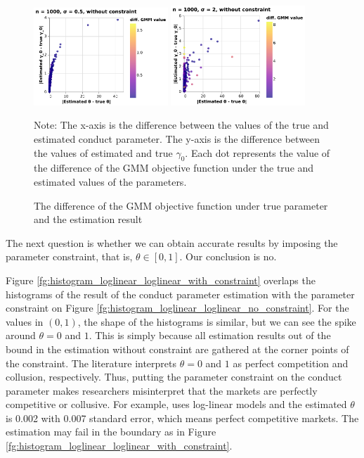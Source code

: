 \documentclass[11pt, a4paper]{article}
\begin{document}
\begin{figure}[!htbp]
  \begin{center}
  \includegraphics[width = 0.45\textwidth]
  {figuretable/diff_gmm_value_loglinear_loglinear_n_1000_sigma_0.5_non_constraint.pdf}
  \includegraphics[width = 0.45\textwidth]
  {figuretable/diff_gmm_value_loglinear_loglinear_n_1000_sigma_2_non_constraint.pdf}
  \caption{The difference of the GMM objective function under true parameter and the estimation result}
  \label{fg:diff_gmm_loglinear_loglinear} 
  \end{center}
  \footnotesize
  Note: The x-axis is the difference between the values of the true and estimated conduct parameter. The y-axis is the difference between the values of estimated and true $\gamma_0$. Each dot represents the value of the difference of the GMM objective function under the true and estimated values of the parameters. 
\end{figure} 

The next question is whether we can obtain accurate results by imposing the parameter constraint, that is, $\theta \in [0,1]$.
Our conclusion is no.

Figure \ref{fg:histogram_loglinear_loglinear_with_constraint} overlaps the histograms of the result of the conduct parameter estimation with the parameter constraint on Figure \ref{fg:histogram_loglinear_loglinear_no_constraint}.
For the values in $(0,1)$, the shape of the histograms is similar, but we can see the spike around $\theta = 0$ and $1$.
This is simply because all estimation results out of the bound in the estimation without constraint are gathered at the corner points of the constraint.
The literature interprets $\theta = 0$ and $1$ as perfect competition and collusion, respectively.
Thus, putting the parameter constraint on the conduct parameter makes researchers misinterpret that the markets are perfectly competitive or collusive.
For example, \cite{merel2009measuring} uses log-linear models and the estimated $\theta$ is 0.002 with 0.007 standard error, which means perfect competitive markets. 
The estimation may fail in the boundary as in Figure \ref{fg:histogram_loglinear_loglinear_with_constraint}. 
\end{document}
